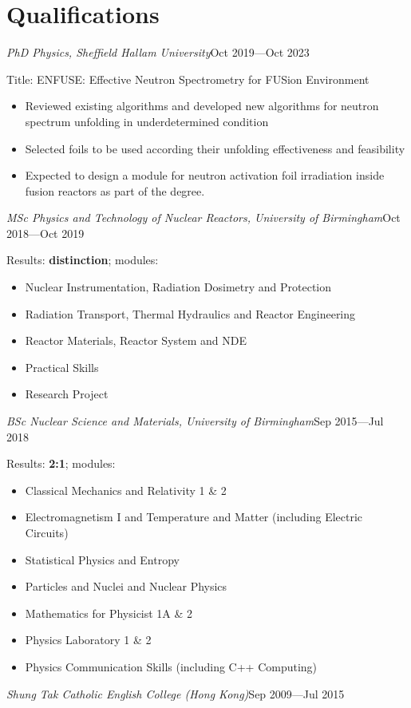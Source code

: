 \documentclass[a4paper, 12pt]{article}
\newcommand{\expentry}[3]{\emph{#1}\hfill{#2}---{#3}}
\begin{document}
\section{Qualifications}
\expentry{PhD Physics, Sheffield Hallam University}{Oct 2019}{Oct 2023}
    
    Title: ENFUSE: Effective Neutron Spectrometry for FUSion Environment
    \begin{itemize}
    \setlength\itemsep{0em}
    \item Reviewed existing algorithms and developed new algorithms for neutron spectrum unfolding in underdetermined condition
    \item Selected foils to be used according their unfolding effectiveness and feasibility
    \item Expected to design a module for neutron activation foil irradiation inside fusion reactors as part of the degree.
    \end{itemize}
\begin{adjustwidth}{-0.3cm}{-0.7cm} %
\expentry{MSc Physics and Technology of Nuclear Reactors, University of Birmingham}{Oct 2018}{Oct 2019}
\end{adjustwidth} %

    Results: \textbf{distinction}; modules:
    \begin{itemize}
    \setlength\itemsep{0em}
    \item Nuclear Instrumentation, Radiation Dosimetry and Protection
    \item Radiation Transport, Thermal Hydraulics and Reactor Engineering
    \item Reactor Materials, Reactor System and NDE
    \item Practical Skills
    \item Research Project
    \end{itemize}
\expentry{BSc Nuclear Science and Materials, University of Birmingham} {Sep 2015}{Jul 2018}

    Results: \textbf{2:1}; modules:
    \begin{itemize}
    \setlength\itemsep{0em}
    \item Classical Mechanics and Relativity 1 \& 2
    \item Electromagnetism I and Temperature and Matter (including Electric Circuits)
    \item Statistical Physics and Entropy
    \item Particles and Nuclei and Nuclear Physics
    \item Mathematics for Physicist 1A \& 2
    \item Physics Laboratory 1 \& 2
    \item Physics Communication Skills (including C++ Computing)
    \end{itemize}
\expentry{Shung Tak Catholic English College (Hong Kong)}{Sep 2009}{Jul 2015}
    
\end{document}

